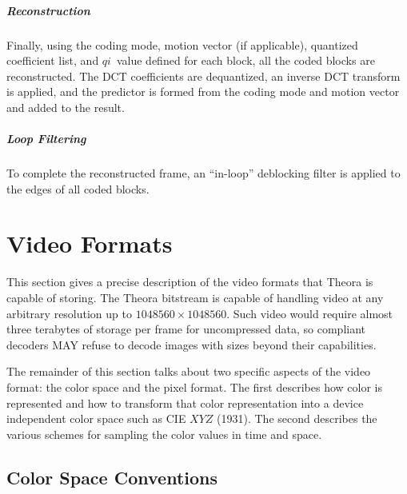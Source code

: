 \documentclass[9pt,letterpaper]{book}
\newcommand{\idx}[1]{{\ensuremath{\mathit{#1}}}}
\newcommand{\qi}{\idx{qi}}
\numberwithin{equation}{chapter}
\numberwithin{figure}{chapter}
\numberwithin{table}{chapter}
\begin{document}
\paragraph{Reconstruction}

Finally, using the coding mode, motion vector (if applicable), quantized
 coefficient list, and \qi\ value defined for each block, all the coded blocks
 are reconstructed.
The DCT coefficients are dequantized, an inverse DCT transform is applied, and
 the predictor is formed from the coding mode and motion vector and added to
 the result.

\paragraph{Loop Filtering}

To complete the reconstructed frame, an ``in-loop'' deblocking filter is
 applied to the edges of all coded blocks.


\chapter{Video Formats}

This section gives a precise description of the video formats that Theora is
 capable of storing.
The Theora bitstream is capable of handling video at any arbitrary resolution
 up to $1048560\times 1048560$.
Such video would require almost three terabytes of storage per frame for
 uncompressed data, so compliant decoders MAY refuse to decode images with
 sizes beyond their capabilities.

The remainder of this section talks about two specific aspects of the video
 format: the color space and the pixel format.
The first describes how color is represented and how to transform that color
 representation into a device independent color space such as CIE $XYZ$ (1931).
The second describes the various schemes for sampling the color values in time
 and space.

\section{Color Space Conventions}
\end{document}
